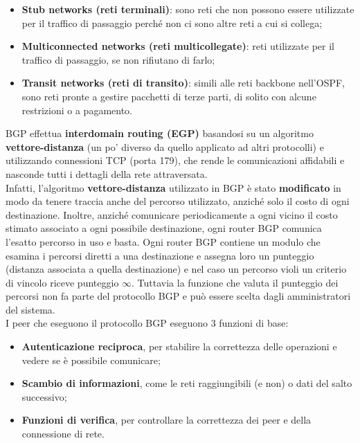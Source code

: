             \begin{itemize}
                \item \textbf{Stub networks (reti terminali)}: sono reti che non possono essere utilizzate per il
                traffico di passaggio perché non ci sono altre reti a cui si collega;
                \item \textbf{Multiconnected networks (reti multicollegate)}: reti utilizzate per il traffico di
                passaggio, se non rifiutano di farlo;
                \item \textbf{Transit networks (reti di transito)}: simili alle reti backbone nell’OSPF, sono reti
                pronte a gestire pacchetti di terze parti, di solito con alcune restrizioni o a pagamento.
            \end{itemize}


        BGP effettua \textbf{interdomain routing (EGP)} basandosi su un algoritmo \textbf{vettore-distanza} (un po’
        diverso da quello applicato ad altri protocolli) e utilizzando connessioni TCP (porta 179), che
        rende le comunicazioni affidabili e nasconde tutti i dettagli della rete attraversata.\\
        

        Infatti, l’algoritmo \textbf{vettore-distanza} utilizzato in BGP è stato \textbf{modificato} in modo da tenere
        traccia anche del percorso utilizzato, anziché solo il costo di ogni destinazione. Inoltre, anziché
        comunicare periodicamente a ogni vicino il costo stimato associato a ogni possibile
        destinazione, ogni router BGP comunica l’esatto percorso in uso e basta. Ogni router BGP
        contiene un modulo che esamina i percorsi diretti a una destinazione e assegna loro un
        punteggio (distanza associata a quella destinazione) e nel caso un percorso violi un criterio di
        vincolo riceve punteggio $\infty$. Tuttavia la funzione che valuta il punteggio dei percorsi non fa
        parte del protocollo BGP e può essere scelta dagli amministratori del sistema.\\

        I peer che eseguono il protocollo BGP eseguono 3 funzioni di base:

            \begin{itemize}
                \item \textbf{Autenticazione reciproca}, per stabilire la correttezza delle operazioni e vedere se è
                possibile comunicare;
                \item \textbf{Scambio di informazioni}, come le reti raggiungibili (e non) o dati del salto successivo;
                \item \textbf{Funzioni di verifica}, per controllare la correttezza dei peer e della connessione di rete.
            \end{itemize}


